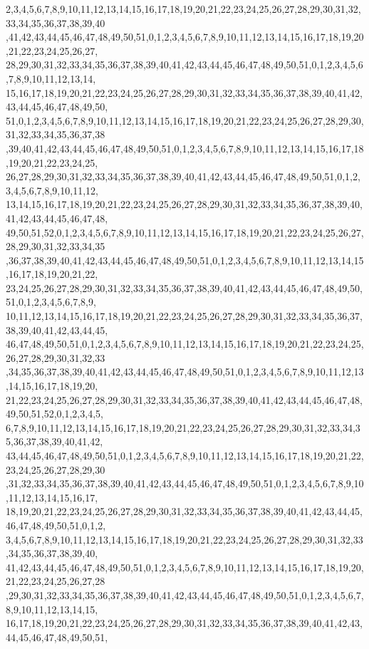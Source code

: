 \begin{DoxyCode}
      2,3,4,5,6,7,8,9,10,11,12,13,14,15,16,17,18,19,20,21,22,23,24,25,26,27,28,29,30,31,32,33,34,35,36,37,38,39,40
      ,41,42,43,44,45,46,47,48,49,50,51,0,1,2,3,4,5,6,7,8,9,10,11,12,13,14,15,16,17,18,19,20,21,22,23,24,25,26,27,
      28,29,30,31,32,33,34,35,36,37,38,39,40,41,42,43,44,45,46,47,48,49,50,51,0,1,2,3,4,5,6,7,8,9,10,11,12,13,14,
      15,16,17,18,19,20,21,22,23,24,25,26,27,28,29,30,31,32,33,34,35,36,37,38,39,40,41,42,43,44,45,46,47,48,49,50,
      51,0,1,2,3,4,5,6,7,8,9,10,11,12,13,14,15,16,17,18,19,20,21,22,23,24,25,26,27,28,29,30,31,32,33,34,35,36,37,38
      ,39,40,41,42,43,44,45,46,47,48,49,50,51,0,1,2,3,4,5,6,7,8,9,10,11,12,13,14,15,16,17,18,19,20,21,22,23,24,25,
      26,27,28,29,30,31,32,33,34,35,36,37,38,39,40,41,42,43,44,45,46,47,48,49,50,51,0,1,2,3,4,5,6,7,8,9,10,11,12,
      13,14,15,16,17,18,19,20,21,22,23,24,25,26,27,28,29,30,31,32,33,34,35,36,37,38,39,40,41,42,43,44,45,46,47,48,
      49,50,51,52,0,1,2,3,4,5,6,7,8,9,10,11,12,13,14,15,16,17,18,19,20,21,22,23,24,25,26,27,28,29,30,31,32,33,34,35
      ,36,37,38,39,40,41,42,43,44,45,46,47,48,49,50,51,0,1,2,3,4,5,6,7,8,9,10,11,12,13,14,15,16,17,18,19,20,21,22,
      23,24,25,26,27,28,29,30,31,32,33,34,35,36,37,38,39,40,41,42,43,44,45,46,47,48,49,50,51,0,1,2,3,4,5,6,7,8,9,
      10,11,12,13,14,15,16,17,18,19,20,21,22,23,24,25,26,27,28,29,30,31,32,33,34,35,36,37,38,39,40,41,42,43,44,45,
      46,47,48,49,50,51,0,1,2,3,4,5,6,7,8,9,10,11,12,13,14,15,16,17,18,19,20,21,22,23,24,25,26,27,28,29,30,31,32,33
      ,34,35,36,37,38,39,40,41,42,43,44,45,46,47,48,49,50,51,0,1,2,3,4,5,6,7,8,9,10,11,12,13,14,15,16,17,18,19,20,
      21,22,23,24,25,26,27,28,29,30,31,32,33,34,35,36,37,38,39,40,41,42,43,44,45,46,47,48,49,50,51,52,0,1,2,3,4,5,
      6,7,8,9,10,11,12,13,14,15,16,17,18,19,20,21,22,23,24,25,26,27,28,29,30,31,32,33,34,35,36,37,38,39,40,41,42,
      43,44,45,46,47,48,49,50,51,0,1,2,3,4,5,6,7,8,9,10,11,12,13,14,15,16,17,18,19,20,21,22,23,24,25,26,27,28,29,30
      ,31,32,33,34,35,36,37,38,39,40,41,42,43,44,45,46,47,48,49,50,51,0,1,2,3,4,5,6,7,8,9,10,11,12,13,14,15,16,17,
      18,19,20,21,22,23,24,25,26,27,28,29,30,31,32,33,34,35,36,37,38,39,40,41,42,43,44,45,46,47,48,49,50,51,0,1,2,
      3,4,5,6,7,8,9,10,11,12,13,14,15,16,17,18,19,20,21,22,23,24,25,26,27,28,29,30,31,32,33,34,35,36,37,38,39,40,
      41,42,43,44,45,46,47,48,49,50,51,0,1,2,3,4,5,6,7,8,9,10,11,12,13,14,15,16,17,18,19,20,21,22,23,24,25,26,27,28
      ,29,30,31,32,33,34,35,36,37,38,39,40,41,42,43,44,45,46,47,48,49,50,51,0,1,2,3,4,5,6,7,8,9,10,11,12,13,14,15,
      16,17,18,19,20,21,22,23,24,25,26,27,28,29,30,31,32,33,34,35,36,37,38,39,40,41,42,43,44,45,46,47,48,49,50,51,

\end{DoxyCode}

